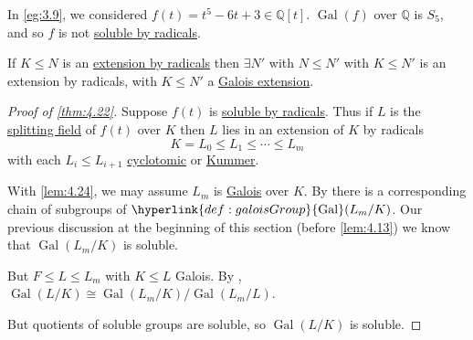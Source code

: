 \documentclass{article}
\DeclareMathOperator{\Gal}{Gal}
\begin{document}
\begin{eg}
    In \cref{eg:3.9}, we considered $f(t) = t^5 - 6t + 3 \in \mathbb{Q}[t]$. $\Gal(f)$ over $\mathbb{Q}$ is $S_5$, and so $f$ is not \hyperlink{def:radicals}{soluble by radicals}.
\end{eg}
\begin{nlemma}\label{lem:4.24}
    If $K \leq N$ is an \hyperlink{def:radicals}{extension by radicals} then $\exists N'$ with $N \leq N'$ with $K \leq N'$ is an extension by radicals, with $K \leq N'$ a \hyperlink{def:galoisExt}{Galois extension}.
\end{nlemma}
\begin{proof}[Proof of \cref{thm:4.22}]
    Suppose $f(t)$ is \hyperlink{def:radicals}{soluble by radicals}.
    Thus if $L$ is the \hyperlink{def:splitting}{splitting field} of $f(t)$ over $K$ then $L$ lies in an extension of $K$ by radicals
    \begin{equation*}
        K = L_0 \leq L_1 \leq \dotsb \leq L_m
    \end{equation*}
    with each $L_i \leq L_{i+1}$ \hyperlink{def:cycloExt}{cyclotomic} or \hyperlink{def:kummerExt}{Kummer}.

    With \cref{lem:4.24}, we may assume $L_m$ is \hyperlink{def:galoisExt}{Galois} over $K$.
    By  there is a corresponding chain of subgroups of $\hyperlink{def:galoisGroup}{\Gal}(L_m/K)$.
    Our previous discussion at the beginning of this section (before \cref{lem:4.13}) we know that $\Gal(L_m/K)$ is soluble.

    But $F \leq L \leq L_m$ with $K \leq L$ Galois.
    By , $\Gal(L/K) \cong \Gal(L_m/K)/\Gal(L_m/L)$.

    But quotients of soluble groups are soluble, so $\Gal(L/K)$ is soluble.
\end{proof}
\end{document}
